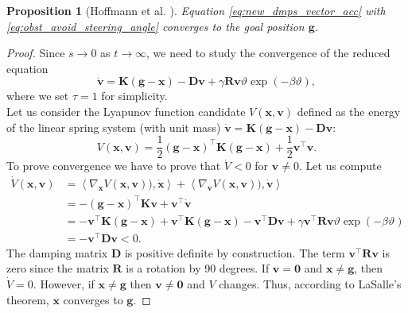 \documentclass[fleqn, 11pt]{article}
\theoremstyle{definition}
\theoremstyle{plain}
\newtheorem{prop}{Proposition}[section]
\theoremstyle{remark}
\begin{document}
\begin{prop}[Hoffmann et al. \cite{HPPS09}]\label{prop:obstacle_convergence}
    Equation \eqref{eq:new_dmps_vector_acc} with \eqref{eq:obst_avoid_steering_angle} converges to the goal position $ \mathbf{g} $.
\end{prop}
\begin{proof}
    Since $ s \to 0 $ as $ t\to \infty $, we need to study the convergence of the reduced equation
    \[ \dot{\mathbf{v}} = \mathbf{K} (\mathbf{g} - \mathbf{x}) - \mathbf{D} \mathbf{v} + \gamma \mathbf{R} \mathbf{v} \vartheta \exp ( -\beta \vartheta ), \]
    where we set $ \tau = 1 $ for simplicity.\\
    Let us consider the Lyapunov function candidate $ V(\mathbf{x}, \mathbf{v}) $ defined as the energy of the linear spring system (with unit mass) $ \dot{\mathbf{v}} = \mathbf{K} ( \mathbf{g} - \mathbf{x} ) - \mathbf{D} \mathbf{v} $:
    \[ V(\mathbf{x}, \mathbf{v}) = \frac{1}{2} ( \mathbf{g} - \mathbf{x} )^\intercal \mathbf{K} ( \mathbf{g} - \mathbf{x} ) + \frac{1}{2} \mathbf{v}^\intercal \mathbf{v} . \]
    To prove convergence we have to prove that $ \dot{V} < 0 $ for $ \mathbf{v} \neq 0 $.
    Let us compute
    \begin{align*}
        \dot{V} (\mathbf{x}, \mathbf{v})
            & = \left\langle {\nabla_\mathbf{x} V(\mathbf{x}, \mathbf{v}))} , {  \dot{\mathbf{x}}} \right\rangle  + \left\langle {\nabla_\mathbf{v} V(\mathbf{x}, \mathbf{v}))} , {  \dot{\mathbf{v}}} \right\rangle  \\
            & = - ( \mathbf{g} - \mathbf{x} )^\intercal \mathbf{K} \mathbf{v} + \mathbf{v}^\intercal \dot{\mathbf{v}} \\
            & = - \mathbf{v} ^\intercal \mathbf{K} ( \mathbf{g} - \mathbf{x} ) + \mathbf{v} ^\intercal \mathbf{K} ( \mathbf{g} - \mathbf{x} ) - \mathbf{v} ^\intercal \mathbf{D}\mathbf{v} + \gamma \mathbf{v}^\intercal \mathbf{R} \mathbf{v} \vartheta \exp ( -\beta \vartheta ) \\
            & = -\mathbf{v} ^\intercal \mathbf{D} \mathbf{v} < 0.
    \end{align*}
    The damping matrix $ \mathbf{D} $ is positive definite by construction.
    The term $ \mathbf{v}^\intercal \mathbf{R} \mathbf{v} $ is zero since the matrix $\mathbf{R}$ is a rotation by 90 degrees.
    If $ \mathbf{v} = \mathbf{0} $ and $ \mathbf{x} \neq \mathbf{g} $, then $ \dot{V} = 0 $.
    However, if $ \mathbf{x} \neq \mathbf{g} $ then $ \mathbf{v} \neq \mathbf{0} $ and $V$ changes.
    Thus, according to LaSalle's theorem, $ \mathbf{x} $ converges to $ \mathbf{g} $.
\end{proof}
\end{document}

